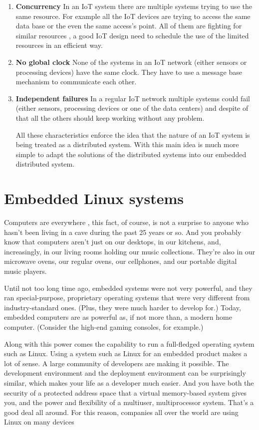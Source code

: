 \begin{enumerate}
\item \textbf{Concurrency}
In an IoT system there are multiple systems trying to use the same resource.
For example all the IoT devices are trying to access the same data base or the
even the same access's point. All of them are fighting for similar resources , a
good IoT design need to schedule the use of the limited resources in an efficient
way.

\item \textbf{No global clock}
None of the systems in an IoT network (either sensors or processing devices)
have the same clock. They have to use a message base mechanism to communicate
each other. 

\item \textbf{Independent failures}
In a regular IoT network multiple systems could fail (either sensors,
processing devices or one of the data centers) and despite of that all the
others should keep working without any problem. 

All these characteristics enforce the idea that the nature of an IoT system is
being treated as a distributed system. With this main idea is much more simple
to adapt the solutions of the distributed systems into our embedded distributed
system.

\end{enumerate}

\section{Embedded Linux systems}

Computers are everywhere , this fact, of course, is not a surprise to anyone 
who hasn't been living in a cave during the past 25 years or so. And you
probably know that computers aren't just on our desktops, in our kitchens, and, 
increasingly, in our living rooms holding our music collections. They're also 
in our microwave ovens, our regular ovens, our cellphones, and our portable 
digital music players.

Until not too long time ago, embedded systems were not very powerful, and they
ran special-purpose, proprietary operating systems that were very different
from industry-standard ones. (Plus, they were much harder to develop for.)
Today, embedded computers are as powerful as, if not more than, a modern home
computer. (Consider the high-end gaming consoles, for example.)

Along with this power comes the capability to run a full-fledged operating
system such as Linux. Using a system such as Linux for an embedded product
makes a lot of sense. A large community of developers are making it possible.
The development environment and the deployment environment can be surprisingly
similar, which makes your life as a developer much easier. And you have both
the security of a protected address space that a virtual memory-based system
gives you, and the power and flexibility of a multiuser, multiprocessor system.
That's a good deal all around. For this reason, companies all over the world
are using Linux on many devices


